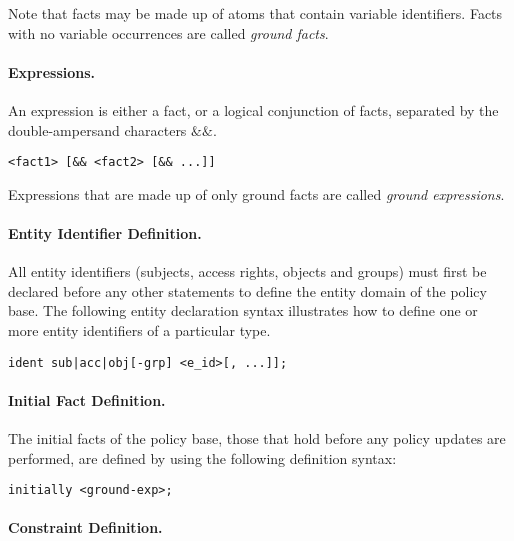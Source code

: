 \documentclass{llncs}
\begin{document}
          Note that facts may be made up of atoms that contain variable
          identifiers. Facts with no variable occurrences are called
          {\em ground facts}.

        \paragraph{\bf Expressions.}
          An expression is either a fact, or a logical conjunction of facts,
          separated by the double-ampersand characters $\&\&$.

          \begin{verbatim}<fact1> [&& <fact2> [&& ...]]\end{verbatim}

          Expressions that are made up of only ground facts are called
          {\em ground expressions}.

        \paragraph{\bf Entity Identifier Definition.}

          All entity identifiers (subjects, access rights, objects and groups)
          must first be declared before any other statements to define the
          entity domain of the policy base. The following entity declaration
          syntax illustrates how to define one or more entity identifiers of a
          particular type.

          \begin{verbatim}ident sub|acc|obj[-grp] <e_id>[, ...]];\end{verbatim}

        \paragraph{\bf Initial Fact Definition.}

          The initial facts of the policy base, those that hold before any
          policy updates are performed, are defined by using the following
          definition syntax:

          \begin{verbatim}initially <ground-exp>;\end{verbatim}

        \paragraph{\bf Constraint Definition.}
\end{document}
